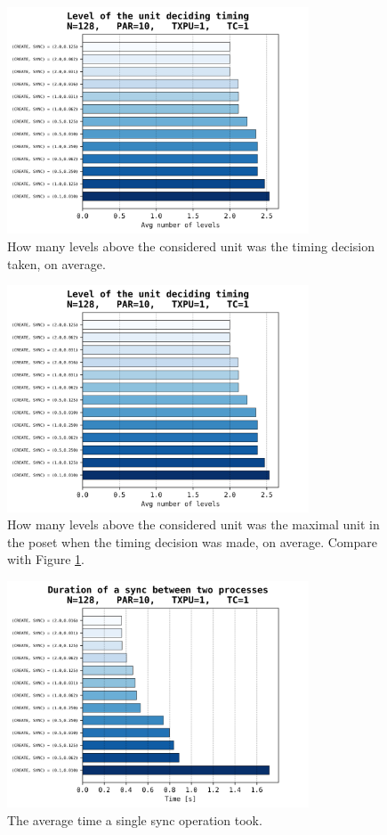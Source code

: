 \documentclass[a4paper,10pt]{article}
\begin{document}
			\begin{figure}[h]
				\centering
				\includegraphics[width=0.8\textwidth]{bar_plots/final_exp1/decision_height.png}
				\caption{How many levels above the considered unit was the timing decision taken, on average.}
				\label{fig:delaysDecisionUnit}
			\end{figure}
			\begin{figure}[h]
				\centering
				\includegraphics[width=0.8\textwidth]{bar_plots/final_exp1/decision_height.png}
				\caption{How many levels above the considered unit was the maximal unit in the poset when the timing decision was made, on average. Compare with Figure \ref{fig:delaysDecisionUnit}.}
				\label{fig:delaysDecisionPoset}
			\end{figure}
			\begin{figure}[h]
				\centering
				\includegraphics[width=0.8\textwidth]{bar_plots/final_exp1/time_per_sync.png}
				\caption{The average time a single sync operation took.}
				\label{fig:delaysTimePerSync}
			\end{figure}
\end{document}
